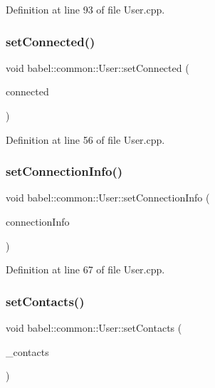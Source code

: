 Definition at line 93 of file User.\+cpp.

\mbox{\label{classbabel_1_1common_1_1_user_a8ed42b85ce28caa1c04c2592e09e1925}} 
\subsubsection{\texorpdfstring{set\+Connected()}{setConnected()}}
{\footnotesize\ttfamily void babel\+::common\+::\+User\+::set\+Connected (\begin{DoxyParamCaption}\item[{bool}]{connected }\end{DoxyParamCaption})}



Definition at line 56 of file User.\+cpp.

\mbox{\label{classbabel_1_1common_1_1_user_a739b57a2489b0c7784a98852a0539ff1}} 
\subsubsection{\texorpdfstring{set\+Connection\+Info()}{setConnectionInfo()}}
{\footnotesize\ttfamily void babel\+::common\+::\+User\+::set\+Connection\+Info (\begin{DoxyParamCaption}\item[{const \mbox{\hyperlink{classbabel_1_1common_1_1_connection_info}{Connection\+Info}} \&}]{connection\+Info }\end{DoxyParamCaption})}



Definition at line 67 of file User.\+cpp.

\mbox{\label{classbabel_1_1common_1_1_user_adc7949c540c63549dbb20b0ea314e622}} 
\subsubsection{\texorpdfstring{set\+Contacts()}{setContacts()}}
{\footnotesize\ttfamily void babel\+::common\+::\+User\+::set\+Contacts (\begin{DoxyParamCaption}\item[{const std\+::vector$<$ uint32\+\_\+t $>$ \&}]{\+\_\+contacts }\end{DoxyParamCaption})}




